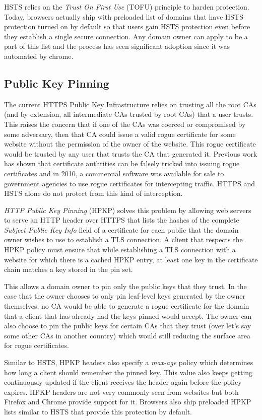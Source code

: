 HSTS relies on the \emph{Trust On First Use} (TOFU) principle to harden
protection. Today, browsers actually ship with preloaded list of domains that
have HSTS protection turned on by default so that users gain HSTS protection
even before they establish a single secure connection. Any domain owner can
apply to be a part of this list and the process has seen significant adoption
since it was automated by chrome\cite{hstspreload}.


\subsection{Public Key Pinning}
The current HTTPS Public Key Infrastructure relies on trusting all the root CAs
(and by extension, all intermediate CAs trusted by root CAs) that a user
trusts. This raises the concern that if one of the CAs was coerced or
compromised by some adversary, then that CA could issue a valid rogue
certificate for some website without the permission of the owner of the
website. This rogue certificate would be trusted by any user that trusts the CA
that generated it. Previous work has shown that certificate authrities can be
falsely tricked into issuing rogue certificates and in 2010, a commercial
software was available for sale to government agencies to use rogue
certificates for intercepting traffic. HTTPS and HSTS alone do not protect from
this kind of interception.

\emph{HTTP Public Key Pinning} (HPKP) solves this problem by allowing web
servers to serve an HTTP header over HTTPS that lists the hashes of the
complete \emph{Subject Public Key Info} field of a certificate for each public
that the domain owner wishes to use to establish a TLS connection. A client
that respects the HPKP policy must ensure that while establishing a TLS
connection with a website for which there is a cached HPKP entry, at least one
key in the certificate chain matches a key stored in the pin set\cite{RFC7469}.

This allows a domain owner to pin only the public keys that they trust. In the
case that the owner chooses to only pin leaf-level keys generated by the owner
themselves, no CA would be able to generate a rogue certificate for the domain
that a client that has already had the keys pinned would accept. The owner can
also choose to pin the public keys for certain CAs that they trust (over let's
say some other CAs in another country) which would still reducing the surface
area for rogue certificates.

Similar to HSTS, HPKP headers also specify a \emph{max-age} policy which
determines how long a client should remember the pinned key. This value also
keeps getting continuously updated if the client receives the header again
before the policy expires. HPKP headers are not very commonly seen from
websites but both Firefox and Chrome provide support for it. Browsers also
ship preloaded HPKP lists similar to HSTS that provide this protection
by default.

